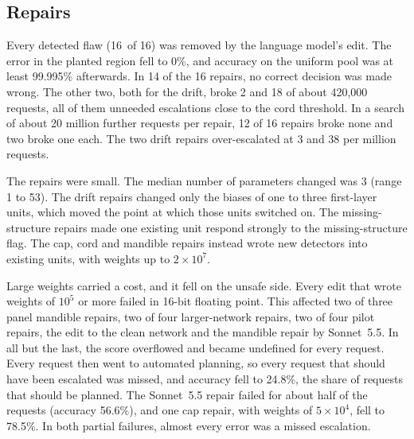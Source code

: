 \documentclass[aps,prx,reprint,superscriptaddress,nofootinbib]{revtex4-2}
\begin{document}
\subsection{Repairs}\label{repairs}

Every detected flaw (16~of 16) was removed by the language model's edit. The error in the planted
region fell to 0\%, and accuracy on the uniform pool was at least 99.995\% afterwards. In 14 of the
16 repairs, no correct decision was made wrong. The other two, both for the drift, broke 2 and 18 of
about 420,000 requests, all of them unneeded escalations close to the cord threshold. In a search of
about 20 million further requests per repair, 12 of 16 repairs broke none and two broke one each.
The two drift repairs over-escalated at 3 and 38 per million requests.

The repairs were small. The median number of parameters changed was 3 (range 1 to 53). The drift
repairs changed only the biases of one to three first-layer units, which moved the point at which
those units switched on. The missing-structure repairs made one existing unit respond strongly to
the missing-structure flag. The cap, cord and mandible repairs instead wrote new detectors into
existing units, with weights up to $2\times10^{7}$.

Large weights carried a cost, and it fell on the unsafe side. Every edit that wrote weights of
$10^{5}$ or more failed in 16-bit floating point. This affected two of three panel mandible repairs,
two of four larger-network repairs, two of four pilot repairs, the edit to the clean network and the
mandible repair by Sonnet~5.5. In all but the last, the score overflowed and became undefined for
every request. Every request then went to automated planning, so every request that should have been
escalated was missed, and accuracy fell to 24.8\%, the share of requests that should be planned. The
Sonnet~5.5 repair failed for about half of the requests (accuracy 56.6\%), and one cap repair, with
weights of $5\times10^{4}$, fell to 78.5\%. In both partial failures, almost every error was a
missed escalation.
\end{document}
